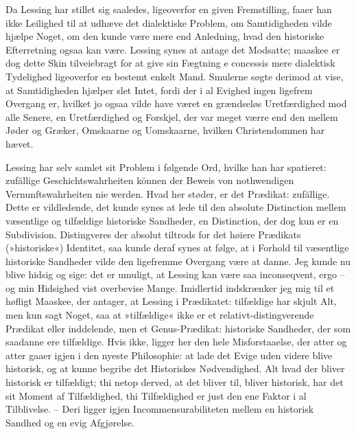 \documentclass[12pt,a4paper]{article}
\begin{document}
Da Lessing har stillet sig saaledes, ligeoverfor en given Fremstilling, faaer han ikke Leilighed til at udhæve det dialektiske Problem, om Samtidigheden vilde hjælpe Noget, om den kunde være mere end Anledning, hvad den historiske Efterretning ogsaa kan være. Lessing synes at antage det Modsatte; maaskee er dog dette Skin tilveiebragt for at give sin Fægtning e concessis mere dialektisk Tydelighed ligeoverfor en bestemt enkelt Mand. Smulerne søgte derimod at vise, at Samtidigheden hjælper slet Intet, fordi der i al Evighed ingen ligefrem Overgang er, hvilket jo ogsaa vilde have været en grændseløs Uretfærdighed mod alle Senere, en Uretfærdighed og Forskjel, der var meget værre end den mellem Jøder og Græker, Omskaarne og Uomskaarne, hvilken Christendommen har hævet.

Lessing har selv samlet sit Problem i følgende Ord, hvilke han har spatieret: zufällige Geschichtswahrheiten können der Beweis von nothwendigen Vernunftswahrheiten nie werden. Hvad her støder, er det Prædikat: zufällige. Dette er vildledende, det kunde synes at lede til den absolute Distinction mellem væsentlige og tilfældige historiske Sandheder, en Distinction, der dog kun er en Subdivision. Distingveres der absolut tiltrods for det høiere Prædikats (»historiske«) Identitet, saa kunde deraf synes at følge, at i Forhold til væsentlige historiske Sandheder vilde den ligefremme Overgang være at danne. Jeg kunde nu blive hidsig og sige: det er umuligt, at Lessing kan være saa inconseqvent, ergo – og min Hidsighed vist overbevise Mange. Imidlertid indskrænker jeg mig til et høfligt Maaskee, der antager, at Lessing i Prædikatet: tilfældige har skjult Alt, men kun sagt Noget, saa at »tilfældige« ikke er et relativt-distingverende Prædikat eller inddelende, men et Genus-Prædikat: historiske Sandheder, der som saadanne ere tilfældige. Hvis ikke, ligger her den hele Misforstaaelse, der atter og atter gaaer igjen i den nyeste Philosophie: at lade det Evige uden videre blive historisk, og at kunne begribe det Historiskes Nødvendighed. Alt hvad der bliver historisk er tilfældigt; thi netop derved, at det bliver til, bliver historisk, har det sit Moment af Tilfældighed, thi Tilfældighed er just den ene Faktor i al Tilblivelse. – Deri ligger igjen Incommensurabiliteten mellem en historisk Sandhed og en evig Afgjørelse.
\end{document}
